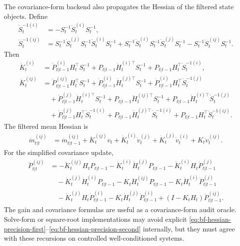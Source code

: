 The covariance-form backend also propagates the Hessian of the filtered state
objects.  Define
\begin{align}
\label{eq:bf-hessian-precision-first}
  \dot S_t^{-1(i)}
  &=
  -S_t^{-1}\dot S_t^{(i)}S_t^{-1},\\
\label{eq:bf-hessian-precision-second}
  \ddot S_t^{-1(ij)}
  &=
  S_t^{-1}\dot S_t^{(j)}S_t^{-1}\dot S_t^{(i)}S_t^{-1}
  +S_t^{-1}\dot S_t^{(i)}S_t^{-1}\dot S_t^{(j)}S_t^{-1}
  -S_t^{-1}\ddot S_t^{(ij)}S_t^{-1}.
\end{align}
Then
\begin{align}
\label{eq:bf-hessian-gain-first}
  \dot K_t^{(i)}
  &=
  \dot P_{t|t-1}^{(i)}H_t^\top S_t^{-1}
  +P_{t|t-1}\dot H_t^{(i)\top}S_t^{-1}
  +P_{t|t-1}H_t^\top\dot S_t^{-1(i)},\\
\label{eq:bf-hessian-gain-second}
  \ddot K_t^{(ij)}
  &=
  \ddot P_{t|t-1}^{(ij)}H_t^\top S_t^{-1}
  +\dot P_{t|t-1}^{(i)}\dot H_t^{(j)\top}S_t^{-1}
  +\dot P_{t|t-1}^{(i)}H_t^\top\dot S_t^{-1(j)}
  \nonumber\\
  &\quad
  +\dot P_{t|t-1}^{(j)}\dot H_t^{(i)\top}S_t^{-1}
  +P_{t|t-1}\ddot H_t^{(ij)\top}S_t^{-1}
  +P_{t|t-1}\dot H_t^{(i)\top}\dot S_t^{-1(j)}
  \nonumber\\
  &\quad
  +\dot P_{t|t-1}^{(j)}H_t^\top\dot S_t^{-1(i)}
  +P_{t|t-1}\dot H_t^{(j)\top}\dot S_t^{-1(i)}
  +P_{t|t-1}H_t^\top\ddot S_t^{-1(ij)}.
\end{align}
The filtered mean Hessian is
\begin{align}
\label{eq:bf-hessian-filtered-mean}
  \ddot m_{t|t}^{(ij)}
  &=
  \ddot m_{t|t-1}^{(ij)}
  +\ddot K_t^{(ij)}v_t
  +\dot K_t^{(i)}\dot v_t^{(j)}
  +\dot K_t^{(j)}\dot v_t^{(i)}
  +K_t\ddot v_t^{(ij)}.
\end{align}
For the simplified covariance update,
\begin{align}
\label{eq:bf-hessian-filtered-cov}
  \ddot P_{t|t}^{(ij)}
  &=
  -\ddot K_t^{(ij)}H_tP_{t|t-1}
  -\dot K_t^{(i)}\dot H_t^{(j)}P_{t|t-1}
  -\dot K_t^{(i)}H_t\dot P_{t|t-1}^{(j)}
  \nonumber\\
  &\quad
  -\dot K_t^{(j)}\dot H_t^{(i)}P_{t|t-1}
  -K_t\ddot H_t^{(ij)}P_{t|t-1}
  -K_t\dot H_t^{(i)}\dot P_{t|t-1}^{(j)}
  \nonumber\\
  &\quad
  -\dot K_t^{(j)}H_t\dot P_{t|t-1}^{(i)}
  -K_t\dot H_t^{(j)}\dot P_{t|t-1}^{(i)}
  +(I-K_tH_t)\ddot P_{t|t-1}^{(ij)}.
\end{align}
The gain and covariance formulas are useful as a covariance-form audit oracle.
Solve-form or square-root implementations may avoid explicit
\eqref{eq:bf-hessian-precision-first}--\eqref{eq:bf-hessian-precision-second}
internally, but they must agree with these recursions on controlled
well-conditioned systems.

